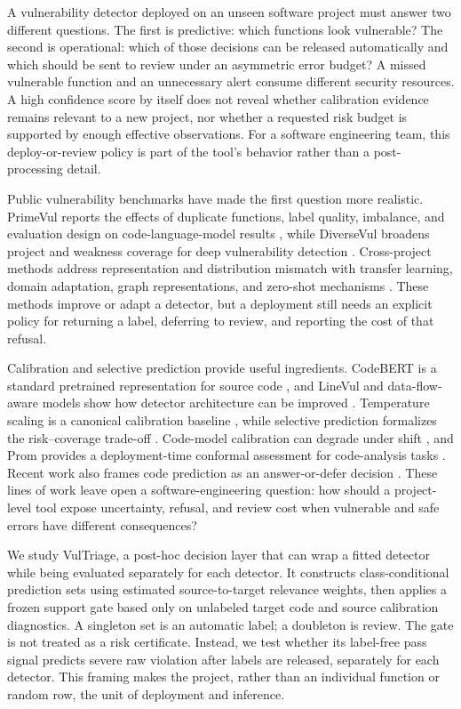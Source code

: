 \documentclass[preprint,12pt]{elsarticle}
\newcommand{\method}{VulTriage\xspace}
\begin{document}
A vulnerability detector deployed on an unseen software project must answer two different questions. The first is predictive: which functions look vulnerable? The second is operational: which of those decisions can be released automatically and which should be sent to review under an asymmetric error budget? A missed vulnerable function and an unnecessary alert consume different security resources. A high confidence score by itself does not reveal whether calibration evidence remains relevant to a new project, nor whether a requested risk budget is supported by enough effective observations. For a software engineering team, this deploy-or-review policy is part of the tool's behavior rather than a post-processing detail.

Public vulnerability benchmarks have made the first question more realistic. PrimeVul reports the effects of duplicate functions, label quality, imbalance, and evaluation design on code-language-model results \cite{ding2025primevul}, while DiverseVul broadens project and weakness coverage for deep vulnerability detection \cite{chen2023diversevul}. Cross-project methods address representation and distribution mismatch with transfer learning, domain adaptation, graph representations, and zero-shot mechanisms \cite{lin2018transfer,liu2022cdvuld,zhang2023cpvd,nguyen2024dam2p,cai2024csvdtf,haque2026zsvuld}. These methods improve or adapt a detector, but a deployment still needs an explicit policy for returning a label, deferring to review, and reporting the cost of that refusal.

Calibration and selective prediction provide useful ingredients. CodeBERT is a standard pretrained representation for source code \cite{feng2020codebert}, and LineVul and data-flow-aware models show how detector architecture can be improved \cite{fu2022linevul,steenhoek2024deepdfa}. Temperature scaling is a canonical calibration baseline \cite{guo2017calibration}, while selective prediction formalizes the risk--coverage trade-off \cite{geifman2019selectivenet}. Code-model calibration can degrade under shift \cite{zhou2024calibration}, and Prom provides a deployment-time conformal assessment for code-analysis tasks \cite{wang2025prom}. Recent work also frames code prediction as an answer-or-defer decision \cite{rathnasuriya2026defer}. These lines of work leave open a software-engineering question: how should a project-level tool expose uncertainty, refusal, and review cost when vulnerable and safe errors have different consequences?

We study \method, a post-hoc decision layer that can wrap a fitted detector while being evaluated separately for each detector. It constructs class-conditional prediction sets using estimated source-to-target relevance weights, then applies a frozen support gate based only on unlabeled target code and source calibration diagnostics. A singleton set is an automatic label; a doubleton is review. The gate is not treated as a risk certificate. Instead, we test whether its label-free pass signal predicts severe raw violation after labels are released, separately for each detector. This framing makes the project, rather than an individual function or random row, the unit of deployment and inference.
\end{document}

